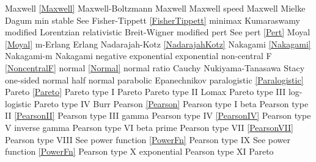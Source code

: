 Maxwell 						\dotfill	\eqref{Maxwell} 					\ncite	%
Maxwell-Boltzmann 				\dotfill	Maxwell 							\ncite 	%
Maxwell speed					\dotfill	Maxwell 							\ncite	%
Mielke						\dotfill	Dagum							\ncite	%
min stable						\dotfill	See Fisher-Tippett \eqref{FisherTippett}	\ncite
minimax 						\dotfill	Kumaraswamy 						 	%
modified Lorentzian				\dotfill	relativistic Breit-Wigner					%
modified pert					\dotfill	See pert \eqref{Pert}					\ncite	%
Moyal						\dotfill	\eqref{Moyal}						\ncite	
m-Erlang						\dotfill	Erlang 							\ncite	%
%
Nadarajah-Kotz					\dotfill	\eqref{NadarajahKotz}				\mcite{\self}	%
Nakagami 					\dotfill	\eqref{Nakagami} 					\ncite	%
Nakagami-m 					\dotfill	Nakagami 						\ncite   	%
negative exponential				\dotfill	exponential 						\ncite	%
non-central F					\dotfill		\eqref{NoncentralF}				\ncite	%
normal 						\dotfill	\eqref{Normal}						\ncite	%
normal ratio  					\dotfill	Cauchy 							\ncite	%
Nukiyama-Tanasawa 			\dotfill	Stacy 							   	%
%
one-sided normal  				\dotfill	half normal						\ncite	%
parabolic						\dotfill	Epanechnikov						\ncite
paralogistic					\dotfill	\eqref{Paralogistic} 					\ncite	%
Pareto						\dotfill	\eqref{Pareto}						\ncite	%
Pareto type I					\dotfill	Pareto							\ncite	%
Pareto type II					\dotfill	Lomax 							\ncite	%
Pareto type III					\dotfill	log-logistic						\ncite	%
Pareto type IV					\dotfill	Burr								\ncite	%
Pearson			 			\dotfill	\eqref{Pearson}						\ncite	%
Pearson type I					\dotfill	beta 								\ncite	%
Pearson type II					\dotfill	\eqref{PearsonII}					\ncite	%
Pearson type III   				\dotfill	gamma 							\ncite	%
Pearson type IV   				\dotfill	\eqref{PearsonIV} 					\ncite	%
Pearson type V    				\dotfill	inverse gamma						\ncite	%
Pearson type VI				\dotfill	beta prime 						\ncite	%
Pearson type VII				\dotfill	\eqref{PearsonVII} 					\ncite	%
Pearson type VIII				\dotfill	See power function \eqref{PowerFn}		\ncite	%
Pearson type IX				\dotfill	See power function \eqref{PowerFn}		\ncite	%
Pearson type X    				\dotfill	exponential						\ncite	%
Pearson type XI    				\dotfill	Pareto							   	%
